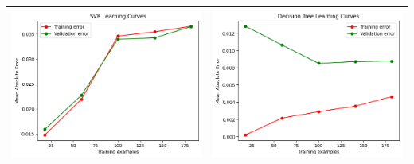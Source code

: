 \begin{table}[H]
    \centering
    \footnotesize
    \setlength\tabcolsep{0pt}
    \begin{tabularx}{\textwidth}{|X|X|}
        \hline
        \includegraphics[width=\linewidth, trim=0 0 0 0]{images/SVR_lc80_ridotto.png} &
        \includegraphics[width=\linewidth, trim=0 0 0 0]{images/DecisionTree_lc80_ridotto.png} \\
        \hline

\end{tabularx}
\end{table}

